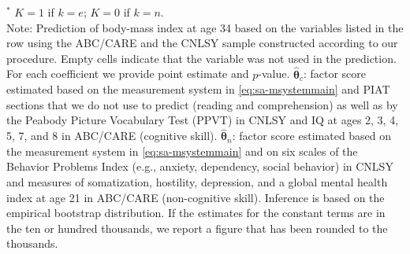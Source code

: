 \documentclass[static]{JJH-Beamer}
\begin{document}
\begin{frame}
\begin{table}[H]
\begin{center}
{}
\end{center}
\tiny \flushleft
$^\ast$ $K=1$ if $k=e$; $K=0$ if $k=n$.\\
Note: Prediction of body-mass index at age 34 based on the variables listed in the row using the ABC/CARE and the CNLSY sample constructed according to our procedure. Empty cells indicate that the variable was not used in the prediction. For each coefficient we provide point estimate and $p$-value. $\hat{\bm{\theta}}_{c}$: factor score estimated based on the measurement system in \eqref{eq:sa-msystemmain} and PIAT sections that we do not use to predict (reading and comprehension) as well as by the Peabody Picture Vocabulary Test (PPVT) in CNLSY and IQ at ages 2, 3, 4, 5, 7, and 8 in ABC/CARE (cognitive skill). $\hat{\bm{\theta}}_{n}$: factor score estimated based on the measurement system in \eqref{eq:sa-msystemmain} and on six scales of the Behavior Problems Index (e.g., anxiety, dependency, social behavior) in CNLSY and measures of somatization, hostility, depression, and a global mental health index at age 21 in ABC/CARE (non-cognitive skill). Inference is based on the empirical bootstrap distribution. If the estimates for the constant terms are in the ten or hundred thousands, we report a figure that has been rounded to the thousands.\\
\end{table}

\end{frame}
\end{document}
